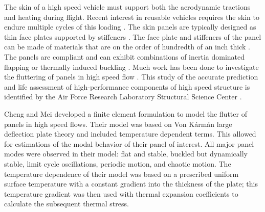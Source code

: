 \documentclass[conf]{new-aiaa}
\begin{document}
The skin of a high speed vehicle must support both
the aerodynamic tractions and heating during flight.
Recent interest in reusable vehicles requires
the skin to endure multiple cycles of this loading
\cite{
  walker_falcon_htv_3X_a_resuable_hypersonic_test_bed,
  eason_structures_perspective_on_the_challenges_associated_with_analyzing_reuasble_hypersonic_platform,
  zuchowski_AVIATR_Predictive_capability_for_hypersonic_structural_response_and_life_prediction_phase_II,
  lafontaine_effects_of_strain_hardeing_on_response_of_skin_panels_in_hypersonic_flow}.
The skin panels are typically designed as thin face plates supported 
by stiffeners 
\cite{
  mcnamara_aeroelastic_and_aerothermoelastic_analysis_in_hypersonic_flow_past_present_and_future}.
The face plate and stiffeners of the panel 
can be made of materials that are on the order
of hundredth of an inch thick
\cite{
  plews_a_two_scale_generalized_finite_element_approach_for_modeling_localized_thermoplasticity,
  zuchowski_AVIATR_Predictive_capability_for_hypersonic_structural_response_and_life_prediction_phase_II}.
The panels are compliant and can exhibit combinations of
inertia dominated flapping or thermally induced buckling
\cite{
  thornton_coupled_flow_thermal_and_structural_analysis_of_aerodynamically_heated_panels,
  mei_review_of_nonlinear_panel_flutter_at_supersonic_and_hypersonic_speeds}.
Much work has been done to investigate the fluttering 
of panels in high speed flow
\cite{
  mcnamara_aeroelastic_and_aerothermoelastic_analysis_in_hypersonic_flow_past_present_and_future,
  riley_interaction_between_aerothermally_compliant_structures_and_boudnary_layer_transition_in_hypersonic_flow,
  spottswood_exploring_the_response_of_a_thin_flexible_panel,
  savino_aerothermodynamic_study_of_ultrahigh_termperature_cermaic_winglet_for_atmospheric_reentry_test,
  nydick_hypersonic_panel_flutter_studies_on_cruved_panels,
  lafontaine_effects_of_strain_hardeing_on_response_of_skin_panels_in_hypersonic_flow}.
This study of the accurate prediction and life assessment of high-performance 
components of high speed structure is identified by the Air Force Research Laboratory
Structural Science Center
\cite{ spottswood_on_the_use_of_reduced_order_models_for_a_shallow_curved_beam_under_combined_loading}.

Cheng and Mei
\cite{cheng_FEM_formulation_for_hypersonic_panel_flutter_analyis_with_thermal_effects}
developed a finite element formulation to model the flutter 
of panels in high speed flows. 
Their model was based on Von K\'arm\'an large deflection
plate theory and included temperature dependent terms.
This allowed for estimations of the modal behavior of their panel 
of interest. 
All major panel modes were observed in their model:
flat and stable, buckled but dynamically stable, limit cycle oscillations,
periodic motion, and chaotic motion.
The temperature dependence of their model was based on a prescribed uniform 
surface temperature with a constant gradient into the thickness of the plate;
this temperature gradient was then used with thermal expansion coefficients
to calculate the subsequent thermal stress.
\end{document}
